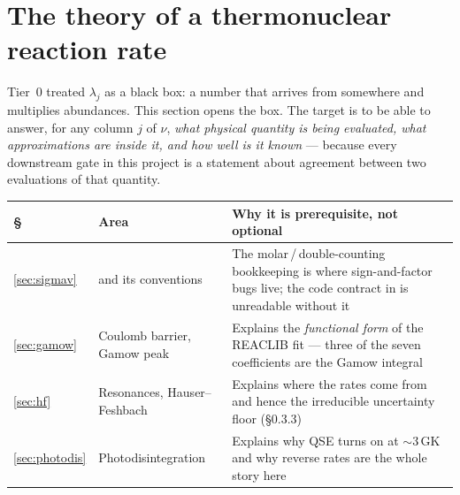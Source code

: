 %

\section{The theory of a thermonuclear reaction rate}
\label{part:ratetheory}

Tier~0 treated $\lambda_j$ as a black box: a number that arrives from somewhere
and multiplies abundances. This section opens the box. The target is to be able
to answer, for any column $j$ of $\nu$, \emph{what physical quantity is being
evaluated, what approximations are inside it, and how well is it known} ---
because every downstream gate in this project is a statement about agreement
between two evaluations of that quantity.

\begin{center}
\begin{tabularx}{\textwidth}{@{}L{1.2cm} L{4.2cm} Y@{}}
\toprule
\textbf{\S} & \textbf{Area} & \textbf{Why it is prerequisite, not optional} \\
\midrule
\ref{sec:sigmav} & \sigv{} and its conventions &
  The molar\,/\,double-counting bookkeeping is where sign-and-factor bugs
  live; the code contract in  is unreadable without it \\
\ref{sec:gamow} & Coulomb barrier, Gamow peak &
  Explains the \emph{functional form} of the REACLIB fit --- three of the
  seven coefficients are the Gamow integral \\
\ref{sec:hf} & Resonances, Hauser--Feshbach &
  Explains where the rates come from and hence the irreducible uncertainty
  floor (\S0.3.3) \\
\ref{sec:photodis} & Photodisintegration &
  Explains why QSE turns on at ${\sim}3$\,GK and why reverse rates are the
  whole story here \\
\bottomrule
\end{tabularx}
\end{center}

